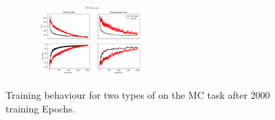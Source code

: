 \begin{figure}[H]
\begin{subfigure}[b]{.49\textwidth}
\end{subfigure}\\
\begin{subfigure}[b]{\textwidth}
    \raggedright
    \includegraphics[width=0.5\textwidth]{figures/comparison/Epochs_2000--A_0.05--N_5--S_1--L_1.png}
\end{subfigure}
\caption[Comparison between two \mya]{\label{fig:test1}Training behaviour for two types of \mya on the MC task after 2000 training Epochs.}
\end{figure}